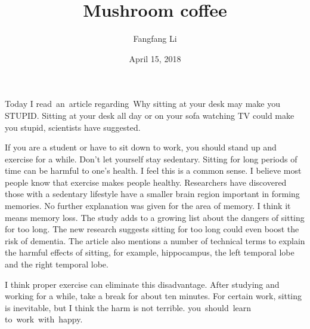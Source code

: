 \documentclass{article}
\author{Fangfang Li}
\date{April 15, 2018}
\title{Mushroom coffee}
\begin{document}
\maketitle
Today I read an article regarding Why sitting at your desk may make you STUPID. Sitting at your desk all day or on your sofa watching TV could make you stupid, scientists have suggested.

If you are a student or have to sit down to work, you should stand up and exercise for a while. Don't let yourself stay sedentary. Sitting for long periods of time can be harmful to one's health. I feel this is a common sense. I believe most people know that exercise makes people healthy. Researchers have discovered those with a sedentary lifestyle have a smaller brain region important in forming memories. No further explanation was given for the area of memory. I think it means memory loss. The study adds to a growing list about the dangers of sitting for too long.                The new research suggests sitting for too long could even boost the risk of dementia. The article also mentions a number of technical terms to explain the harmful effects of sitting, for example, hippocampus, the left temporal lobe and the right temporal lobe.

I think proper exercise can eliminate this disadvantage. After studying and working for a while, take a break for about ten minutes. For certain work, sitting is inevitable, but I think the harm is not terrible. you should learn to work with happy.
\end{document}
